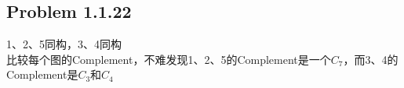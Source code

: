 \subsection*{Problem 1.1.22}
1、2、5同构，3、4同构 \\
\indent 比较每个图的Complement，不难发现1、2、5的Complement是一个$C_7$，而3、4的Complement是$C_3$和$C_4$

